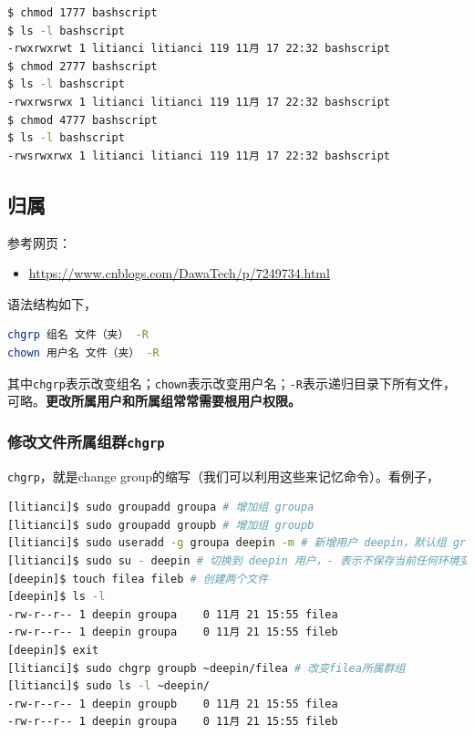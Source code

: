 \documentclass[doctor,openright,twoside]{sjtuthesis}
\providecommand{\tightlist}{%
    \setlength{\itemsep}{0pt}\setlength{\parskip}{0pt}}
\newcommand{\passthrough}[1]{#1}
\theoremstyle{plain}
\theoremstyle{definition}
\theoremstyle{remark}
\theoremstyle{ocrenumbox}
\theoremstyle{plain}
\begin{document}
\begin{lstlisting}[language=bash]
$ chmod 1777 bashscript 
$ ls -l bashscript 
-rwxrwxrwt 1 litianci litianci 119 11月 17 22:32 bashscript
$ chmod 2777 bashscript 
$ ls -l bashscript 
-rwxrwsrwx 1 litianci litianci 119 11月 17 22:32 bashscript
$ chmod 4777 bashscript 
$ ls -l bashscript 
-rwsrwxrwx 1 litianci litianci 119 11月 17 22:32 bashscript
\end{lstlisting}

\subsection{归属}

参考网页：

\begin{itemize}
\tightlist
\item
  \url{https://www.cnblogs.com/DawaTech/p/7249734.html}
\end{itemize}

语法结构如下，

\begin{lstlisting}[language=bash]
chgrp 组名 文件（夹） -R
chown 用户名 文件（夹） -R
\end{lstlisting}

其中\passthrough{\lstinline!chgrp!}表示改变组名；\passthrough{\lstinline!chown!}表示改变用户名；\passthrough{\lstinline!-R!}表示递归目录下所有文件，可略。\textbf{更改所属用户和所属组常常需要根用户权限。}

\hypertarget{chgrp}{%
\subsubsection{\texorpdfstring{修改文件所属组群\texttt{chgrp}}{修改文件所属组群chgrp}}\label{chgrp}}

\passthrough{\lstinline!chgrp!}，就是change
group的缩写（我们可以利用这些来记忆命令）。看例子，

\begin{lstlisting}[language=bash]
[litianci]$ sudo groupadd groupa # 增加组 groupa
[litianci]$ sudo groupadd groupb # 增加组 groupb
[litianci]$ sudo useradd -g groupa deepin -m # 新增用户 deepin，默认组 groupa,自带主目录
[litianci]$ sudo su - deepin # 切换到 deepin 用户，- 表示不保存当前任何环境变量
[deepin]$ touch filea fileb # 创建两个文件
[deepin]$ ls -l
-rw-r--r-- 1 deepin groupa    0 11月 21 15:55 filea
-rw-r--r-- 1 deepin groupa    0 11月 21 15:55 fileb
[deepin]$ exit
[litianci]$ sudo chgrp groupb ~deepin/filea # 改变filea所属群组
[litianci]$ sudo ls -l ~deepin/
-rw-r--r-- 1 deepin groupb    0 11月 21 15:55 filea
-rw-r--r-- 1 deepin groupa    0 11月 21 15:55 fileb
\end{lstlisting}
\end{document}
